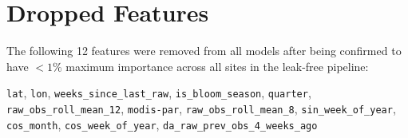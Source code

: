 \documentclass[preprint,12pt,authoryear]{elsarticle}
\begin{document}
\section{Dropped Features}
\label{app:dropped-features}

The following 12 features were removed from all models after being confirmed to have $< 1\%$ maximum importance across all sites in the leak-free pipeline:

\begin{center}
\small
\texttt{lat}, \texttt{lon}, \texttt{weeks\_since\_last\_raw}, \texttt{is\_bloom\_season}, \texttt{quarter}, \texttt{raw\_obs\_roll\_mean\_12}, \texttt{modis-par}, \texttt{raw\_obs\_roll\_mean\_8}, \texttt{sin\_week\_of\_year}, \texttt{cos\_month}, \texttt{cos\_week\_of\_year}, \texttt{da\_raw\_prev\_obs\_4\_weeks\_ago}
\end{center}




\end{document}
